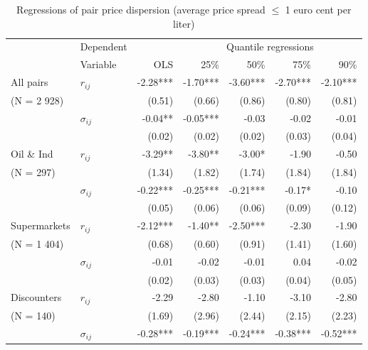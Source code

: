 \documentclass[english]{article}
\begin{document}
\begin{table}%
\caption{Regressions of pair price dispersion (average price spread $\le$ 1 euro cent per liter)}
\label{tab:regs_pairs}
\begin{threeparttable}
    \begin{tabular}{rrrrrrr}
    \toprule
    \toprule
          & \multicolumn{1}{l}{Dependent} &       & \multicolumn{4}{c}{Quantile regressions} \\
          & \multicolumn{1}{l}{Variable} & OLS   & 25\%  & 50\%  & 75\%  & 90\% \\
    \midrule
    \multicolumn{1}{l}{All pairs} & \multicolumn{1}{l}{$r_{ij}$} & -2.28*** & -1.70*** & -3.60*** & -2.70*** & -2.10*** \\
    \multicolumn{1}{l}{(N =  2 928)} &       & (0.51) & (0.66) & (0.86) & (0.80) & (0.81) \\
          & \multicolumn{1}{l}{$\sigma_{ij}$} & -0.04** & -0.05*** & -0.03 & -0.02 & -0.01 \\
          &       & (0.02) & (0.02) & (0.02) & (0.03) & (0.04) \\
    \midrule
    \multicolumn{1}{l}{Oil \& Ind} & \multicolumn{1}{l}{$r_{ij}$} & -3.29** & -3.80** & -3.00* & -1.90 & -0.50 \\
    \multicolumn{1}{l}{ (N = 297)} &       & (1.34) & (1.82) & (1.74) & (1.84) & (1.84) \\
          & \multicolumn{1}{l}{$\sigma_{ij}$} & -0.22*** & -0.25*** & -0.21*** & -0.17* & -0.10 \\
          &       & (0.05) & (0.06) & (0.06) & (0.09) & (0.12) \\
    \midrule
    \multicolumn{1}{l}{Supermarkets} & \multicolumn{1}{l}{$r_{ij}$} & -2.12*** & -1.40** & -2.50*** & -2.30 & -1.90 \\
    \multicolumn{1}{l}{ (N = 1 404)} &       & (0.68) & (0.60) & (0.91) & (1.41) & (1.60) \\
          & \multicolumn{1}{l}{$\sigma_{ij}$} & -0.01 & -0.02 & -0.01 & 0.04  & -0.02 \\
          &       & (0.02) & (0.03) & (0.03) & (0.04) & (0.05) \\
    \midrule
    \multicolumn{1}{l}{Discounters} & \multicolumn{1}{l}{$r_{ij}$} & -2.29 & -2.80 & -1.10 & -3.10 & -2.80 \\
    \multicolumn{1}{l}{ (N = 140)} &       & (1.69) & (2.96) & (2.44) & (2.15) & (2.23) \\
          & \multicolumn{1}{l}{$\sigma_{ij}$} & -0.28*** & -0.19*** & -0.24*** & -0.38*** & -0.52*** \\

\end{tabular}
\end{threeparttable}
\end{table}
\end{document}
